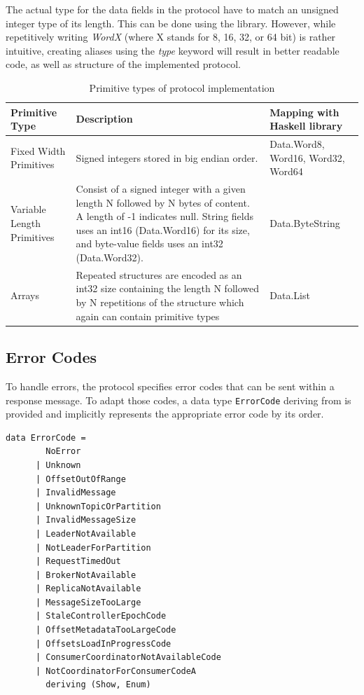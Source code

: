 The actual type for the data fields in the protocol have to match an unsigned
integer type of its length. This can be done using the
library. However, while repetitively writing \textit{WordX} (where X stands for
8, 16, 32, or 64 bit) is rather intuitive, creating aliases using the
\textit{type} keyword will result in better readable code, as well as structure
of the implemented protocol. 

\begin{table}[H]
    \centering
    \begin{tabular}{| p{3cm}| p{7cm} | p{3.5cm} |}
\hline
\textbf{Primitive Type} & \textbf{Description} & \textbf{Mapping with Haskell library} \\ \hline
Fixed Width Primitives     & Signed integers stored in big endian order.
& Data.Word8, Word16, Word32, Word64 \\ \hline
Variable Length Primitives & Consist of a signed integer with a given length N
followed by N bytes of content. A length of -1 indicates null. String fields uses an
int16 (Data.Word16) for its size, and byte-value fields uses an int32 (Data.Word32).    &
Data.ByteString \\ \hline
Arrays                     & Repeated structures are encoded as an int32
size containing the length N followed by N repetitions of the structure which
again can contain primitive types & Data.List                          \\ \hline
\end{tabular}
 \caption{Primitive types of protocol implementation}
\end{table}

\subsection{Error Codes}
\label{subsec:protocol-types-error-codes}

To handle errors, the protocol specifies error codes that can be sent within a
response message. To adapt those codes, a data type \lstinline{ErrorCode}
deriving from
 is provided and implicitly represents the
appropriate error code by its order.

\begin{lstlisting}[caption={Defined types for ErrorCode}]
data ErrorCode =
        NoError
      | Unknown
      | OffsetOutOfRange
      | InvalidMessage
      | UnknownTopicOrPartition
      | InvalidMessageSize
      | LeaderNotAvailable
      | NotLeaderForPartition
      | RequestTimedOut
      | BrokerNotAvailable
      | ReplicaNotAvailable
      | MessageSizeTooLarge
      | StaleControllerEpochCode
      | OffsetMetadataTooLargeCode
      | OffsetsLoadInProgressCode
      | ConsumerCoordinatorNotAvailableCode
      | NotCoordinatorForConsumerCodeA
        deriving (Show, Enum)
\end{lstlisting}

